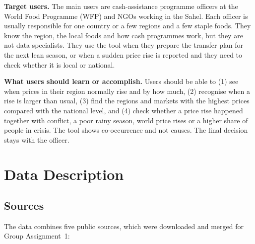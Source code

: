 \documentclass{article}
\begin{document}
\textbf{Target users.} The main users are cash-assistance programme officers at the World Food Programme (WFP) and NGOs working in the Sahel. Each officer is usually responsible for one country or a few regions and a few staple foods. They know the region, the local foods and how cash programmes work, but they are not data specialists. They use the tool when they prepare the transfer plan for the next lean season, or when a sudden price rise is reported and they need to check whether it is local or national.

\textbf{What users should learn or accomplish.} Users should be able to (1) see when prices in their region normally rise and by how much, (2) recognise when a rise is larger than usual, (3) find the regions and markets with the highest prices compared with the national level, and (4) check whether a price rise happened together with conflict, a poor rainy season, world price rises or a higher share of people in crisis. The tool shows co-occurrence and not causes. The final decision stays with the officer.

\section{Data Description}

\subsection{Sources}

The data combines five public sources, which were downloaded and merged for Group Assignment~1:
\end{document}
